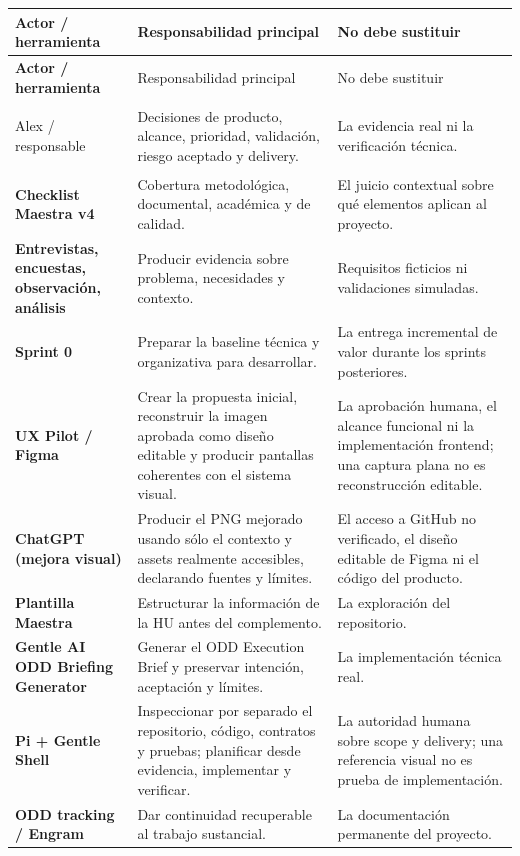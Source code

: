 \documentclass[11pt,a4paper]{article}
\begin{document}
\begin{longtable}{>{\bfseries}p{}p{}p{}}
\toprule
Actor / herramienta & Responsabilidad principal & No debe sustituir \\
\midrule
\endfirsthead
\toprule
Actor / herramienta & Responsabilidad principal & No debe sustituir \\
\midrule
\endhead

Alex / responsable &
Decisiones de producto, alcance, prioridad, validación, riesgo aceptado y delivery. &
La evidencia real ni la verificación técnica. \\

Checklist Maestra v4 &
Cobertura metodológica, documental, académica y de calidad. &
El juicio contextual sobre qué elementos aplican al proyecto. \\

Entrevistas, encuestas, observación, análisis &
Producir evidencia sobre problema, necesidades y contexto. &
Requisitos ficticios ni validaciones simuladas. \\

Sprint 0 &
Preparar la baseline técnica y organizativa para desarrollar. &
La entrega incremental de valor durante los sprints posteriores. \\

UX Pilot / Figma &
Crear la propuesta inicial, reconstruir la imagen aprobada como diseño editable y producir pantallas coherentes con el sistema visual. &
La aprobación humana, el alcance funcional ni la implementación frontend; una captura plana no es reconstrucción editable. \\

ChatGPT (mejora visual) &
Producir el PNG mejorado usando sólo el contexto y assets realmente accesibles, declarando fuentes y límites. &
El acceso a GitHub no verificado, el diseño editable de Figma ni el código del producto. \\

Plantilla Maestra &
Estructurar la información de la HU antes del complemento. &
La exploración del repositorio. \\

Gentle AI ODD Briefing Generator &
Generar el ODD Execution Brief y preservar intención, aceptación y límites. &
La implementación técnica real. \\

Pi + Gentle Shell &
Inspeccionar por separado el repositorio, código, contratos y pruebas; planificar desde evidencia, implementar y verificar. &
La autoridad humana sobre scope y delivery; una referencia visual no es prueba de implementación. \\

ODD tracking / Engram &
Dar continuidad recuperable al trabajo sustancial. &
La documentación permanente del proyecto. \\

\bottomrule
\end{longtable}
\end{document}
